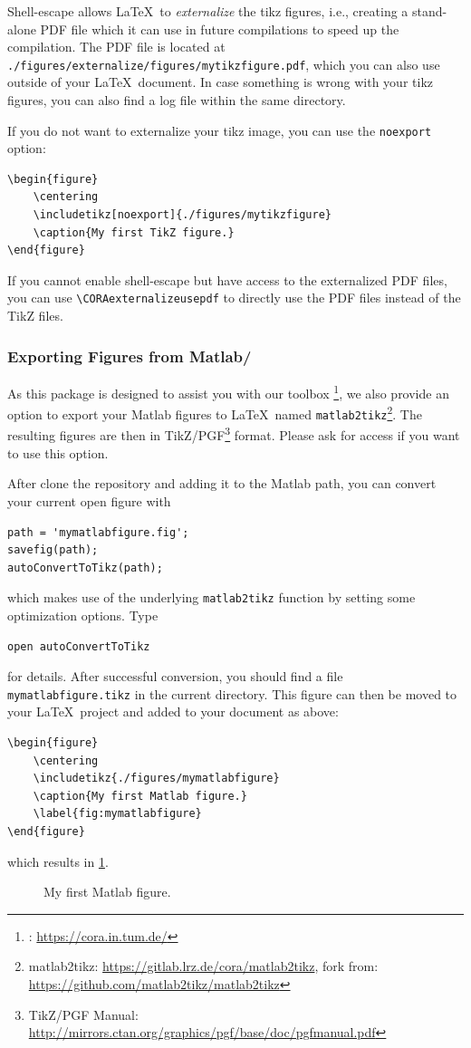 \documentclass{article}
\begin{document}
Shell-escape allows \LaTeX\ to \emph{externalize} the tikz figures,
i.e., creating a stand-alone PDF file which it can use in future compilations to speed up the compilation.
The PDF file is located at \texttt{./figures/externalize/figures/mytikzfigure.pdf},
which you can also use outside of your \LaTeX\ document.
In case something is wrong with your tikz figures, you can also find a log file within the same directory.

If you do not want to externalize your tikz image, you can use the \texttt{noexport} option:
\begin{verbatim}
\begin{figure}
    \centering
    \includetikz[noexport]{./figures/mytikzfigure}
    \caption{My first TikZ figure.}
\end{figure}
\end{verbatim}

If you cannot enable shell-escape but have access to the externalized PDF files,
you can use \verb|\CORAexternalizeusepdf| to directly use the PDF files instead of the TikZ files.

\subsubsection{Exporting Figures from Matlab/\CORA}
As this package is designed to assist you with our toolbox \CORA\footnote{\CORA: \url{https://cora.in.tum.de/}},
we also provide an option to export your Matlab figures to \LaTeX\ named \texttt{matlab2tikz}\footnote{matlab2tikz: \url{https://gitlab.lrz.de/cora/matlab2tikz}, fork from: \url{https://github.com/matlab2tikz/matlab2tikz}}.
The resulting figures are then in TikZ/PGF\footnote{TikZ/PGF Manual: \url{http://mirrors.ctan.org/graphics/pgf/base/doc/pgfmanual.pdf}} format.
Please ask for access if you want to use this option.

After clone the repository and adding it to the Matlab path,
you can convert your current open figure with
\begin{verbatim}
path = 'mymatlabfigure.fig';
savefig(path);
autoConvertToTikz(path);
\end{verbatim}
which makes use of the underlying \texttt{matlab2tikz} function by setting some optimization options. Type
\begin{verbatim}
open autoConvertToTikz
\end{verbatim}
for details.
After successful conversion, you should find a file \texttt{mymatlabfigure.tikz} in the current directory.
This figure can then be moved to your \LaTeX\ project and added to your document as above:
\begin{verbatim}
\begin{figure}
    \centering
    \includetikz{./figures/mymatlabfigure}
    \caption{My first Matlab figure.}
    \label{fig:mymatlabfigure}
\end{figure}
\end{verbatim}
which results in \cref{fig:mymatlabfigure}.
\begin{figure}[h!]
  \centering
  \caption{My first Matlab figure.}
  \label{fig:mymatlabfigure}
\end{figure}
\end{document}
